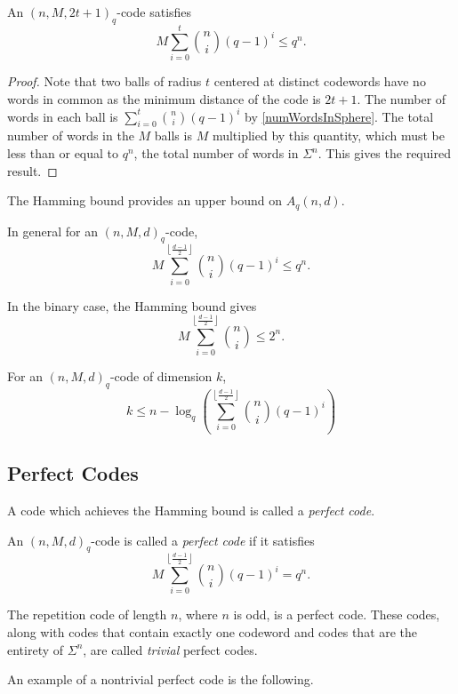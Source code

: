\begin{theorem}
\label{hammingBound}
    An $(n,M,2t+1)_q$-code satisfies
    $$M\sum_{i=0}^t \binom{n}{i}(q-1)^i\leq q^n.$$
\end{theorem}
\begin{proof}
    Note that two balls of radius $t$ centered at distinct codewords have no words in common as the minimum distance of the code is $2t+1$. The number of words in each ball is $\sum_{i=0}^t\binom{n}{i}(q-1)^i$ by \ref{numWordsInSphere}. The total number of words in the $M$ balls is $M$  multiplied by this quantity, which must be less than or equal to $q^n$, the total number of words in $\Sigma^n$. This gives the required result.
\end{proof}

The Hamming bound provides an upper bound on $A_q(n,d)$.

In general for an $(n,M,d)_q$-code, 
$$M\sum_{i=0}^{\left\lfloor\frac{d-1}{2}\right\rfloor} \binom{n}{i}(q-1)^i\leq q^n.$$

In the binary case, the Hamming bound gives
$$M\sum_{i=0}^{\left\lfloor\frac{d-1}{2}\right\rfloor}\binom{n}{i}\leq 2^n.$$

For an $(n,M,d)_q$-code of dimension $k$,
$$k\leq n - \log_q\left(\sum_{i=0}^{\left\lfloor\frac{d-1}{2}\right\rfloor} \binom{n}{i}(q-1)^i\right)$$


\subsection{Perfect Codes}

A code which achieves the Hamming bound is called a \textit{perfect code}.

\begin{definition}
    An $(n,M,d)_q$-code is called a \textit{perfect code} if it satisfies
    $$M\sum_{i=0}^{\left\lfloor\frac{d-1}{2}\right\rfloor} \binom{n}{i}(q-1)^i = q^n.$$
\end{definition}

The repetition code of length $n$, where $n$ is odd, is a perfect code. These codes, along with codes that contain exactly one codeword and codes that are the entirety of $\Sigma^n$, are called \textit{trivial} perfect codes.

\vspace{2mm}
An example of a nontrivial perfect code is the following.

